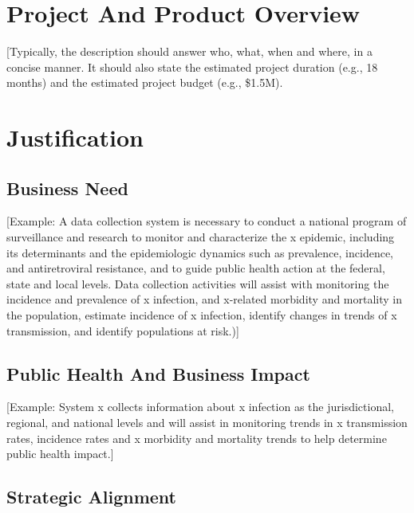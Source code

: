 \documentclass[11pt]{article}
\begin{document}
\section{Project And Product Overview}
\label{sec:org50057e6}
[Typically, the description should answer who, what, when and where, in a concise manner.  It should also state the estimated project duration (e.g., 18 months) and the estimated project budget (e.g., \$1.5M). 
\section{Justification}
\label{sec:org2a1dba7}
\subsection{Business Need}
\label{sec:org3226298}
[Example: A data collection system is necessary to conduct a national program of surveillance and research to monitor and characterize the x epidemic, including its determinants and the epidemiologic dynamics such as prevalence, incidence, and antiretroviral resistance, and to guide public health action at the federal, state and local levels. Data collection activities will assist with monitoring the incidence and prevalence of x infection, and x-related morbidity and mortality in the population, estimate incidence of x infection, identify changes in trends of x transmission, and identify populations at risk.)]


\subsection{Public Health And Business Impact}
\label{sec:orgd16e73d}
[Example: System x collects information about x infection as the jurisdictional, regional, and national levels and will assist in monitoring trends in x transmission rates, incidence rates and x morbidity and mortality trends to help determine public health impact.]
\subsection{Strategic Alignment}
\label{sec:orgefcdd39}
\end{document}
